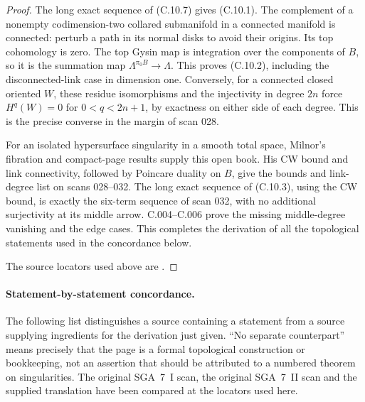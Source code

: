 \begin{proof}
The long exact sequence of (C.10.7) gives (C.10.1). The complement
of a nonempty codimension-two collared submanifold in a connected
manifold is connected: perturb a path in its normal disks to avoid
their origins. Its top cohomology is zero. The top Gysin map is
integration over the components of $B$, so it is the summation map
$\Lambda^{\pi_0B}\to\Lambda$. This proves (C.10.2), including the
disconnected-link case in dimension one. Conversely, for a connected
closed oriented $W$, these residue isomorphisms and the injectivity
in degree $2n$ force $H^q(W)=0$ for $0<q<2n+1$, by exactness on
either side of each degree. This is the precise converse in the
margin of scan 028.

For an isolated hypersurface singularity in a smooth total space,
Milnor's fibration and compact-page results supply this open book.
His CW bound and link connectivity, followed by Poincare duality
on $B$, give the bounds and link-degree list on scans 028--032.
The long exact sequence of (C.10.3), using the CW bound, is exactly
the six-term sequence of scan 032, with no additional surjectivity
at its middle arrow. C.004--C.006 prove the missing middle-degree
vanishing and the edge cases. This completes the derivation of all
the topological statements used in the concordance below.

The source locators used above are \cite{C-ms122,C-milnor1968,C-sga7i,C-sga7ii,C-lamotke1975,C-illusie1994}.
\end{proof}

\paragraph{Statement-by-statement concordance.}
The following list distinguishes a source containing a statement
from a source supplying ingredients for the derivation just given.
``No separate counterpart'' means precisely that the page is a
formal topological construction or bookkeeping, not an assertion
that should be attributed to a numbered theorem on singularities.
The original SGA~7~I scan, the original SGA~7~II scan and the supplied
translation have been compared at the locators used here.

